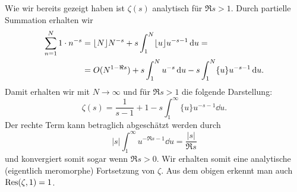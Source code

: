 \begin{remark}
    Wie wir bereits gezeigt haben ist $\zeta(s)$ analytisch für $\Re s > 1$. Durch partielle Summation erhalten wir
    \begin{align*}
        \sum_{n=1}^N 1 \cdot n^{-s} &= \lfloor N \rfloor N^{-s} + s \int_1^N \lfloor u \rfloor u^{-s-1} \mathop{}\!\mathrm{d} u = \\
        &= O(N^{1 - \Re s}) + s \int_1^N u^{-s} \mathop{}\!\mathrm{d} u - s \int_1^N \{ u \} u^{-s-1} \mathop{}\!\mathrm{d} u.
    \end{align*}
    Damit erhalten wir mit $N \to \infty$ und für $\Re s > 1$ die folgende Darstellung:
    $$ \zeta(s) = \frac{1}{s-1} + 1 - s \int_1^\infty \{ u \} u^{-s-1} \dd u. $$
    Der rechte Term kann betraglich abgeschätzt werden durch
    $$ \vert s \vert \int_1^\infty u^{-\Re s - 1} \dd u = \frac{\vert s \vert}{\Re s} $$
    und konvergiert somit sogar wenn $\Re s > 0$. Wir erhalten somit eine analytische (eigentlich meromorphe) Fortsetzung von $\zeta$. Aus dem obigen erkennt man auch $\operatorname*{Res}(\zeta, 1) = 1$.
\end{remark}